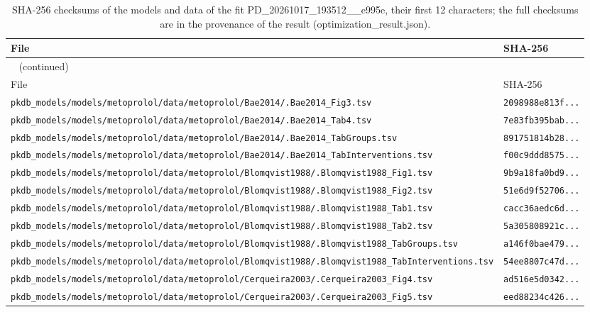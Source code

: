 \begin{longtable}{ll}
\caption{SHA-256 checksums of the models and data of the fit PD\_20261017\_193512\_\_e995e, their first 12 characters; the full checksums are in the provenance of the result (optimization\_result.json).}\label{tab:checksums:PD_20261017_193512__e995e} \\
\toprule
File & SHA-256 \\
\midrule
\endfirsthead
\multicolumn{2}{l}{\small\tablename~\thetable{} (continued)} \\
\toprule
File & SHA-256 \\
\midrule
\endhead
\bottomrule
\endlastfoot
\texttt{pkdb\_models/models/metoprolol/data/metoprolol/Bae2014/.Bae2014\_Fig3.tsv} & \texttt{2098988e813f...} \\
\texttt{pkdb\_models/models/metoprolol/data/metoprolol/Bae2014/.Bae2014\_Tab4.tsv} & \texttt{7e83fb395bab...} \\
\texttt{pkdb\_models/models/metoprolol/data/metoprolol/Bae2014/.Bae2014\_TabGroups.tsv} & \texttt{891751814b28...} \\
\texttt{pkdb\_models/models/metoprolol/data/metoprolol/Bae2014/.Bae2014\_TabInterventions.tsv} & \texttt{f00c9ddd8575...} \\
\texttt{pkdb\_models/models/metoprolol/data/metoprolol/Blomqvist1988/.Blomqvist1988\_Fig1.tsv} & \texttt{9b9a18fa0bd9...} \\
\texttt{pkdb\_models/models/metoprolol/data/metoprolol/Blomqvist1988/.Blomqvist1988\_Fig2.tsv} & \texttt{51e6d9f52706...} \\
\texttt{pkdb\_models/models/metoprolol/data/metoprolol/Blomqvist1988/.Blomqvist1988\_Tab1.tsv} & \texttt{cacc36aedc6d...} \\
\texttt{pkdb\_models/models/metoprolol/data/metoprolol/Blomqvist1988/.Blomqvist1988\_Tab2.tsv} & \texttt{5a305808921c...} \\
\texttt{pkdb\_models/models/metoprolol/data/metoprolol/Blomqvist1988/.Blomqvist1988\_TabGroups.tsv} & \texttt{a146f0bae479...} \\
\texttt{pkdb\_models/models/metoprolol/data/metoprolol/Blomqvist1988/.Blomqvist1988\_TabInterventions.tsv} & \texttt{54ee8807c47d...} \\
\texttt{pkdb\_models/models/metoprolol/data/metoprolol/Cerqueira2003/.Cerqueira2003\_Fig4.tsv} & \texttt{ad516e5d0342...} \\
\texttt{pkdb\_models/models/metoprolol/data/metoprolol/Cerqueira2003/.Cerqueira2003\_Fig5.tsv} & \texttt{eed88234c426...} \\

\end{longtable}
